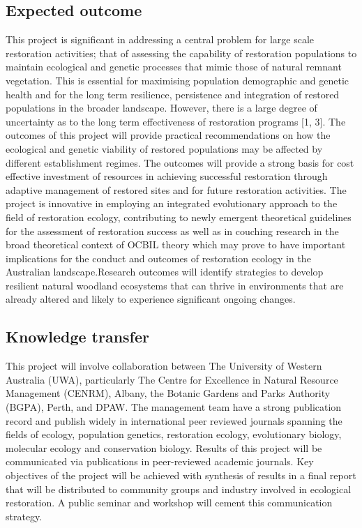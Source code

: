 \documentclass[version=last,
    paper=a4,                               %
    10pt,                                   %
    dvipsnames,
    oneside,                              %
    headings=openany,                       %
    open=any,
    BCOR=7mm,                               %
    DIV=15,     %
]{scrbook}
\begin{document}
\subsection*{Expected outcome}

This project is significant in addressing a central problem for large
scale restoration activities; that of assessing the capability of
restoration populations to maintain ecological and genetic processes
that mimic those of natural remnant vegetation. This is essential for
maximising population demographic and genetic health and for the long
term resilience, persistence and integration of restored populations in
the broader landscape. However, there is a large degree of uncertainty
as to the long term effectiveness of restoration programs {[}1, 3{]}.
The outcomes of this project will provide practical recommendations on
how the ecological and genetic viability of restored populations may be
affected by different establishment regimes. The outcomes will provide a
strong basis for cost effective investment of resources in achieving
successful restoration through adaptive management of restored sites and
for future restoration activities. The project is innovative in
employing an integrated evolutionary approach to the field of
restoration ecology, contributing to newly emergent theoretical
guidelines for the assessment of restoration success as well as in
couching research in the broad theoretical context of OCBIL theory which
may prove to have important implications for the conduct and outcomes of
restoration ecology in the Australian landscape.Research outcomes will
identify strategies to develop resilient natural woodland ecosystems
that can thrive in environments that are already altered and likely to
experience significant ongoing changes.~




\subsection*{Knowledge transfer}

This project will involve collaboration between The University of
Western Australia (UWA), particularly The Centre for Excellence in
Natural Resource Management (CENRM), Albany, the Botanic Gardens and
Parks Authority (BGPA), Perth, and DPAW. The management team have a
strong publication record and publish widely in international peer
reviewed journals spanning the fields of ecology, population genetics,
restoration ecology, evolutionary biology, molecular ecology and
conservation biology. Results of this project will be communicated via
publications in peer-reviewed academic journals. Key objectives of the
project will be achieved with synthesis of results in a final report
that will be distributed to community groups and industry involved in
ecological restoration. A public seminar and workshop will cement this
communication strategy.~
\end{document}
